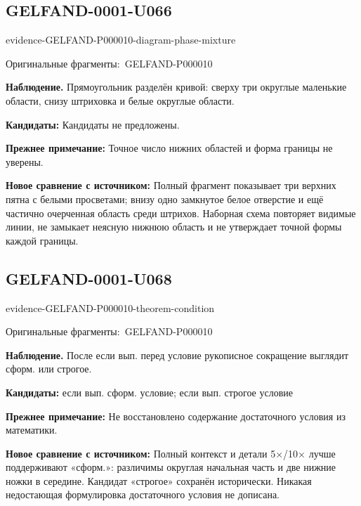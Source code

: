 \documentclass[11pt]{article}
\newcommand{\EvidenceBlock}[4]{%
 \par\smallskip\noindent\begin{minipage}{\linewidth}
 \begin{minipage}[t]{.47\linewidth}\vspace{0pt}\centering
 \csname evidence-#1-#2\endcsname\par
 {\scriptsize\SourceCropCaption\ #1}\par
 \end{minipage}\hfill
 \begin{minipage}[t]{.49\linewidth}\vspace{0pt}\raggedright
 {\small\color{orange!65!black}\textbf{#4} #3}\par
 \end{minipage}
 \end{minipage}\par\smallskip}
\newcommand{\SourceCropCaption}{Оригинальные фрагменты:}\newcommand{\ReadingCaption}{Сомнительное чтение.}\newcommand{\IncompleteCaption}{Неразобранный фрагмент.}\newcommand{\DiagramCaption}{Рисунок и набранное описание.}
\begin{document}
\subsection*{GELFAND-0001-U066}
\EvidenceBlock{GELFAND-P000010}{diagram-phase-mixture}{Прямоугольник разделён кривой: сверху три округлые маленькие области, снизу штриховка и белые округлые области.}{Наблюдение.}
\par\smallskip\noindent\textbf{Кандидаты: } Кандидаты не предложены.\par
\par\smallskip\noindent\textbf{Прежнее примечание: } Точное число нижних областей и форма границы не уверены.\par
\par\smallskip\noindent\textbf{Новое сравнение с источником: } Полный фрагмент показывает три верхних пятна с белыми просветами; внизу одно замкнутое белое отверстие и ещё частично очерченная область среди штрихов. Наборная схема повторяет видимые линии, не замыкает неясную нижнюю область и не утверждает точной формы каждой границы.\par

\subsection*{GELFAND-0001-U068}
\EvidenceBlock{GELFAND-P000010}{theorem-condition}{После если вып. перед условие рукописное сокращение выглядит сформ. или строгое.}{Наблюдение.}
\par\smallskip\noindent\textbf{Кандидаты: } если вып. сформ. условие; если вып. строгое условие\par
\par\smallskip\noindent\textbf{Прежнее примечание: } Не восстановлено содержание достаточного условия из математики.\par
\par\smallskip\noindent\textbf{Новое сравнение с источником: } Полный контекст и детали 5×/10× лучше поддерживают «сформ.»: различимы округлая начальная часть и две нижние ножки в середине. Кандидат «строгое» сохранён исторически. Никакая недостающая формулировка достаточного условия не дописана.\par
\end{document}
